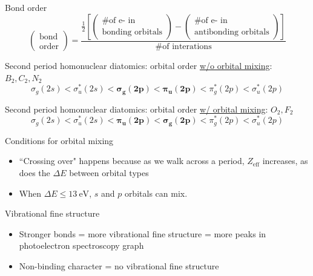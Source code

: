 \documentclass[10pt,landscape]{article}
\begin{document}
\begin{multicols}{3}
Bond order
\[
\begin{pmatrix}
	\text{bond} \\
	\text{order} 
\end{pmatrix}
= 
\frac{
	\frac{1}{2}
	\left[
		\begin{pmatrix}
			\text{\# of e- in } \\
			\text{bonding orbitals} 
		\end{pmatrix}
		-
		\begin{pmatrix}
			\text{\# of e- in } \\
			\text{antibonding orbitals} 
		\end{pmatrix}
	\right]
}{\text{\# of interations}}
\]

Second period homonuclear diatomics: orbital order \underline{w/o orbital mixing}: $B_2, C_2, N_2$
\[ \sigma_g(2s) < \sigma_u^*(2s) < \boldsymbol{\sigma_g(2p) < \pi_u(2p)} < \pi_g^*(2p) < \sigma_u^*(2p) \]

Second period homonuclear diatomics: orbital order \underline{w/ orbital mixing}: $O_2, F_2$
\[ \sigma_g(2s) < \sigma_u^*(2s) < \boldsymbol{\pi_u(2p) < \sigma_g(2p)} < \pi_g^*(2p) < \sigma_u^*(2p) \]

Conditions for orbital mixing
\begin{itemize}
	\item ``Crossing over" happens because as we walk across a period, $Z_\text{eff}$ increases, as does the $\Delta E$ between orbital types
	\item When $\Delta E \leq \SI{13}{\electronvolt}$, $s$ and $p$ orbitals can mix.
\end{itemize}

Vibrational fine structure
\begin{itemize}
	\item Stronger bonds = more vibrational fine structure = more peaks in photoelectron spectroscopy graph
	\item Non-binding character = no vibrational fine structure
\end{itemize}



\end{multicols}
\end{document}
